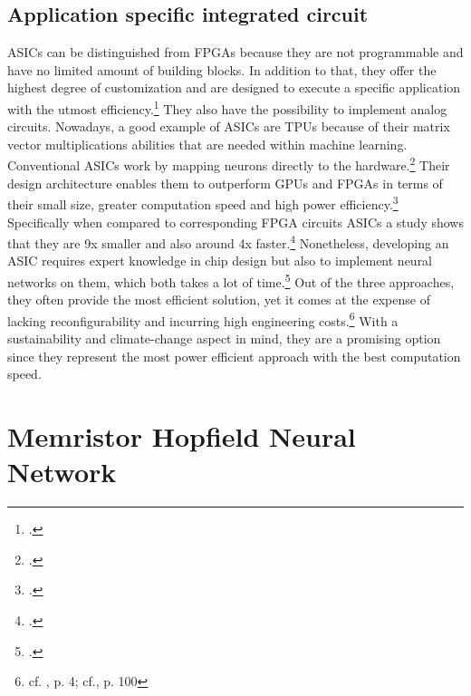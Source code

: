 \subsection{Application specific integrated circuit}
\ac{ASIC}s can be distinguished from \ac{FPGA}s because they are not programmable and have no limited amount of building blocks. 
In addition to that, they offer the highest degree of customization and are designed to execute a specific application with the utmost efficiency.\footcite[cf.][17]{baischerLearningHardwareTutorial2021}
They also have the possibility to implement analog circuits.
Nowadays, a good example of \ac{ASIC}s are \ac{TPU}s because of their matrix vector multiplications abilities that are needed within machine learning.
Conventional \ac{ASIC}s work by mapping neurons directly to the hardware.\footcite[cf.][104]{huSurveyConvolutionalNeural2022}
Their design architecture enables them to outperform \ac{GPU}s and \ac{FPGA}s in terms of their small size, greater computation speed and high power efficiency.\footcite[cf.][17]{baischerLearningHardwareTutorial2021}
Specifically when compared to corresponding \ac{FPGA} circuits \ac{ASIC}s a study shows that they are 9x smaller and also around 4x faster.\footcite[cf.][5]{boutrosFPGAArchitecturePrinciples2021}
Nonetheless, developing an \ac{ASIC} requires expert knowledge in chip design but also to implement neural networks on them, which both takes a lot of time.\footcite[cf.][17]{baischerLearningHardwareTutorial2021}
Out of the three approaches, they often provide the most efficient solution, yet it comes at the expense of lacking reconfigurability and incurring high engineering costs.\footnote{cf. \cite{peccerilloSurveyHardwareAccelerators2022}, p. 4; cf.\cite{huSurveyConvolutionalNeural2022}, p. 100}
With a sustainability and climate-change aspect in mind, they are a promising option since they represent the most power efficient approach with the best computation speed.


\section{Memristor Hopfield Neural Network}

